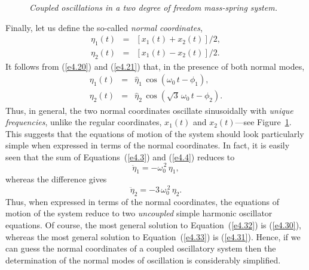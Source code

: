 {\begin{figure}
\epsfysize=3in
\centerline{}
\caption{\em Coupled oscillations in a two degree of freedom mass-spring system.}\label{f4.2}   
\end{figure}

Finally, let us  define the so-called {\em normal coordinates},
\begin{eqnarray}
\eta_1(t) &=& [x_1(t) + x_2(t)]/2,\\[0.5ex]
\eta_2(t) &=& [x_1(t)-x_2(t)]/2.
\end{eqnarray}
It follows from (\ref{e4.20}) and (\ref{e4.21}) that, in the presence of both normal
modes, 
\begin{eqnarray}\label{e4.30}
\eta_1(t) &=&\hat{\eta}_1\,\cos(\omega_0\,t-\phi_1),\\[0.5ex]
\eta_2(t) &=&\hat{\eta}_2\,\cos(\sqrt{3}\,\omega_0\,t-\phi_2).\label{e4.31}
\end{eqnarray}
Thus, in general, the two normal coordinates oscillate sinusoidally with 
{\em unique frequencies}, unlike the regular coordinates, $x_1(t)$ and $x_2(t)$---see Figure~\ref{f4.2}. 
This suggests that the equations of motion of the system should look particularly simple when expressed in terms of the normal coordinates. In fact, it is easily seen that the
sum of Equations~(\ref{e4.3}) and (\ref{e4.4}) reduces to
\begin{equation}\label{e4.32}
\ddot{\eta}_1 = -\omega_0^{\,2}\,\eta_1,
\end{equation}
whereas the difference gives
\begin{equation}\label{e4.33}
\ddot{\eta}_2 = -3\,\omega_0^{\,2}\,\eta_2.
\end{equation}
Thus, when expressed in terms of the normal coordinates, the equations of motion
of the system reduce to two {\em uncoupled}\/ simple harmonic oscillator
equations. 
Of course, the most general solution to Equation~(\ref{e4.32}) is (\ref{e4.30}),
whereas the most  general solution to Equation~(\ref{e4.33}) is (\ref{e4.31}). 
Hence, if we can guess the normal coordinates of a coupled oscillatory
system then the determination of the normal modes of oscillation is considerably simplified. 

}
